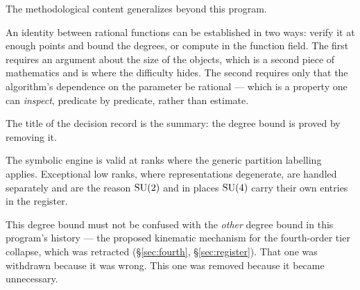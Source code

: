 The methodological content generalizes beyond this program.

An identity between rational functions can be established in two ways:
verify it at enough points and bound the degrees, or compute in the
function field. The first requires an argument about the size of the
objects, which is a second piece of mathematics and is where the
difficulty hides. The second requires only that the algorithm's
dependence on the parameter be rational --- which is a property one can
\emph{inspect}, predicate by predicate, rather than estimate.

The title of the decision record is the summary: the degree bound is
proved by removing it.

\begin{scopenote}
The symbolic engine is valid at ranks where the generic partition
labelling applies. Exceptional low ranks, where representations
degenerate, are handled separately and are the reason $\mathrm{SU}(2)$ and in
places $\mathrm{SU}(4)$ carry their own entries in the register.

This degree bound must not be confused with the \emph{other} degree
bound in this program's history --- the proposed kinematic mechanism
for the fourth-order tier collapse, which was retracted
(\S\ref{sec:fourth}, \S\ref{sec:register}). That one was withdrawn
because it was wrong. This one was removed because it became
unnecessary.
\end{scopenote}
